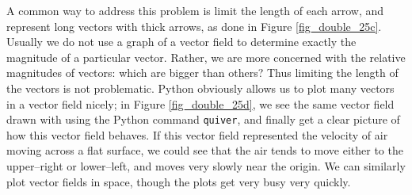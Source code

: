 \ifpython
A common way to address this problem is limit the length of each arrow, and represent long vectors with thick arrows, as done in Figure \ref{fig_double_25c}. Usually we do not use a graph of a vector field to determine exactly the magnitude of a particular vector. Rather, we are more concerned with the relative magnitudes of vectors: which are bigger than others? Thus limiting the length of the vectors is not problematic. Python obviously allows us to plot many vectors in a vector field nicely; in Figure \ref{fig_double_25d}, we see the same vector field drawn with using the Python command \lstinline{quiver}, and finally get a clear picture of how this vector field behaves. If this vector field represented the velocity of air moving across a flat surface, we could see that the air tends to move either to the upper--right or lower--left, and moves very slowly near the origin.  We can similarly plot vector fields in space, though the plots get very busy very quickly.


